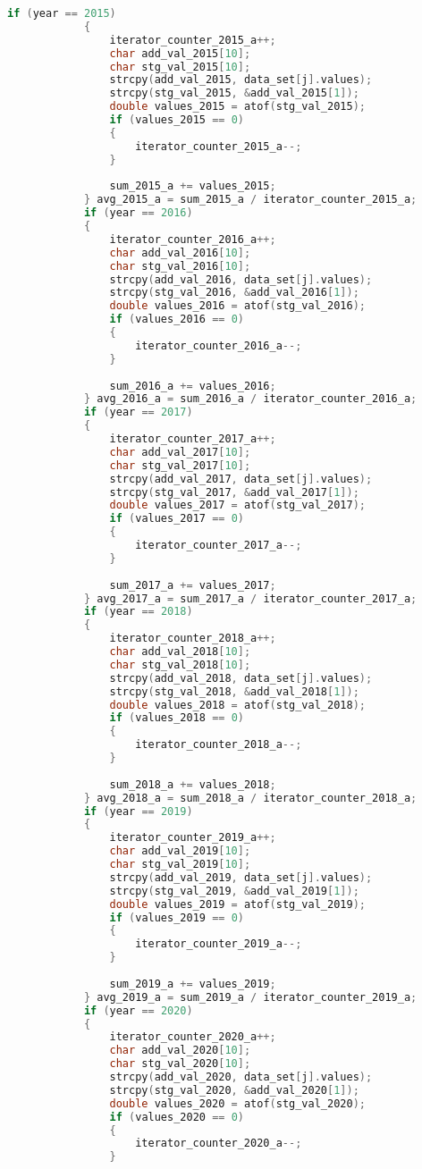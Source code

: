 \begin{lstlisting}[language=C, caption=\textit{CPS 188 Term Project Source Code}]
			if (year == 2015)
			{
				iterator_counter_2015_a++;
				char add_val_2015[10];
				char stg_val_2015[10];
				strcpy(add_val_2015, data_set[j].values);
				strcpy(stg_val_2015, &add_val_2015[1]);
				double values_2015 = atof(stg_val_2015);
				if (values_2015 == 0)
				{
					iterator_counter_2015_a--;
				}
				
				sum_2015_a += values_2015;
			} avg_2015_a = sum_2015_a / iterator_counter_2015_a;
			if (year == 2016)
			{
				iterator_counter_2016_a++;
				char add_val_2016[10];
				char stg_val_2016[10];
				strcpy(add_val_2016, data_set[j].values);
				strcpy(stg_val_2016, &add_val_2016[1]);
				double values_2016 = atof(stg_val_2016);
				if (values_2016 == 0)
				{
					iterator_counter_2016_a--;
				}
				
				sum_2016_a += values_2016;
			} avg_2016_a = sum_2016_a / iterator_counter_2016_a;
			if (year == 2017)
			{
				iterator_counter_2017_a++;
				char add_val_2017[10];
				char stg_val_2017[10];
				strcpy(add_val_2017, data_set[j].values);
				strcpy(stg_val_2017, &add_val_2017[1]);
				double values_2017 = atof(stg_val_2017);
				if (values_2017 == 0)
				{
					iterator_counter_2017_a--;
				}
				
				sum_2017_a += values_2017;
			} avg_2017_a = sum_2017_a / iterator_counter_2017_a;
			if (year == 2018)
			{
				iterator_counter_2018_a++;
				char add_val_2018[10];
				char stg_val_2018[10];
				strcpy(add_val_2018, data_set[j].values);
				strcpy(stg_val_2018, &add_val_2018[1]);
				double values_2018 = atof(stg_val_2018);
				if (values_2018 == 0)
				{
					iterator_counter_2018_a--;
				}
				
				sum_2018_a += values_2018;
			} avg_2018_a = sum_2018_a / iterator_counter_2018_a;
			if (year == 2019)
			{
				iterator_counter_2019_a++;
				char add_val_2019[10];
				char stg_val_2019[10];
				strcpy(add_val_2019, data_set[j].values);
				strcpy(stg_val_2019, &add_val_2019[1]);
				double values_2019 = atof(stg_val_2019);
				if (values_2019 == 0)
				{
					iterator_counter_2019_a--;
				}
				
				sum_2019_a += values_2019;
			} avg_2019_a = sum_2019_a / iterator_counter_2019_a;
			if (year == 2020)
			{
				iterator_counter_2020_a++;
				char add_val_2020[10];
				char stg_val_2020[10];
				strcpy(add_val_2020, data_set[j].values);
				strcpy(stg_val_2020, &add_val_2020[1]);
				double values_2020 = atof(stg_val_2020);
				if (values_2020 == 0)
				{
					iterator_counter_2020_a--;
				}
				

\end{lstlisting}
